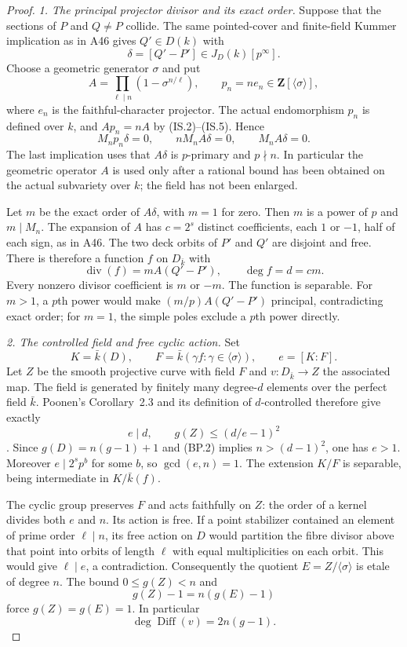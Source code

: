 \documentclass[11pt,a4paper]{article}
\begin{document}
\begin{proof}
\emph{1. The principal projector divisor and its exact order.}
Suppose that the sections of $P$ and $Q\ne P$ collide.
The same pointed-cover and finite-field Kummer implication as
in A46 gives $Q'\in D(k)$ with
\[
                 \delta=[Q'-P']\in J_D(k)[p^\infty].
 \tag{BP.4}
\]
Choose a geometric generator $\sigma$ and put
\[
 A=\prod_{\ell\mid n}(1-\sigma^{n/\ell}),\qquad
 p_n=ne_n\in\mathbf Z[\langle\sigma\rangle],
 \tag{BP.5}
\]
where $e_n$ is the faithful-character projector. The actual
endomorphism $p_n$ is defined over $k$, and $Ap_n=nA$ by
(IS.2)--(IS.5). Hence
\[
 M_np_n\delta=0,\qquad nM_nA\delta=0,
                         \qquad M_nA\delta=0.
 \tag{BP.6}
\]
The last implication uses that $A\delta$ is $p$-primary and
$p\nmid n$. In particular the geometric operator $A$ is used
only after a rational bound has been obtained on the actual
subvariety over $k$; the field has not been enlarged.

Let $m$ be the exact order of $A\delta$, with $m=1$ for zero.
Then $m$ is a power of $p$ and $m\mid M_n$. The expansion of
$A$ has $c=2^s$ distinct coefficients, each $1$ or $-1$, half
of each sign, as in A46. The two deck orbits of $P'$ and $Q'$
are disjoint and free. There is therefore a function $f$ on
$D_{\bar k}$ with
\[
 \operatorname{div}(f)=mA(Q'-P'),\qquad \deg f=d=cm.
 \tag{BP.7}
\]
Every nonzero divisor coefficient is $m$ or $-m$.
The function is separable. For $m>1$, a $p$th power would
make $(m/p)A(Q'-P')$ principal, contradicting exact order;
for $m=1$, the simple poles exclude a $p$th power directly.

\emph{2. The controlled field and free cyclic action.}
Set
\[
 K=\bar k(D),\qquad
 F=\bar k(\gamma f:\gamma\in\langle\sigma\rangle),
                  \qquad e=[K:F].
\]
Let $Z$ be the smooth projective curve with field $F$ and
$v:D_{\bar k}\to Z$ the associated map. The field is generated
by finitely many degree-$d$ elements over the perfect field
$\bar k$. Poonen's Corollary~2.3 and its definition of
$d$-controlled therefore give exactly
\[
                 e\mid d,\qquad g(Z)\le(d/e-1)^2
 \tag{BP.8}
\]
\cite[Proposition~2.1, Lemma~2.2 and Corollary~2.3]{Poonen2007Gonality}.
Since $g(D)=n(g-1)+1$ and (BP.2) implies $n>(d-1)^2$,
one has $e>1$. Moreover $e\mid2^sp^b$ for some $b$, so
$\gcd(e,n)=1$. The extension $K/F$ is separable, being
intermediate in $K/\bar k(f)$.

The cyclic group preserves $F$ and acts faithfully on $Z$:
the order of a kernel divides both $e$ and $n$.
Its action is free. If a point stabilizer contained an element
of prime order $\ell\mid n$, its free action on $D$ would
partition the fibre divisor above that point into orbits of
length $\ell$ with equal multiplicities on each orbit.
This would give $\ell\mid e$, a contradiction.
Consequently the quotient $E=Z/\langle\sigma\rangle$ is etale
of degree $n$. The bound $0\le g(Z)<n$ and
\[
                         g(Z)-1=n(g(E)-1)
\]
force $g(Z)=g(E)=1$. In particular
\[
                 \deg\operatorname{Diff}(v)=2n(g-1).
 \tag{BP.9}
\]


\end{proof}
\end{document}
